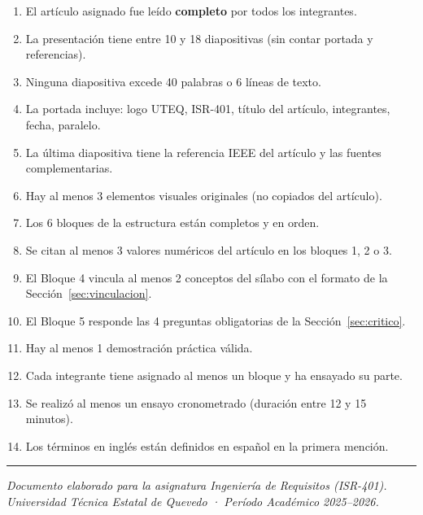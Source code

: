 \documentclass[11pt,a4paper]{article}
\newcommand{\goldrule}{\noindent\textcolor{gold}{\rule{\linewidth}{2pt}}}
\begin{document}
	\begin{okbox}
		\begin{enumerate}[leftmargin=18pt, itemsep=3pt, label=$\square$]
			\item El artículo asignado fue leído \textbf{completo} por todos los integrantes.
			\item La presentación tiene entre 10 y 18 diapositivas (sin contar portada y referencias).
			\item Ninguna diapositiva excede 40 palabras o 6 líneas de texto.
			\item La portada incluye: logo UTEQ, ISR-401, título del artículo, integrantes, fecha, paralelo.
			\item La última diapositiva tiene la referencia IEEE del artículo y las fuentes complementarias.
			\item Hay al menos 3 elementos visuales originales (no copiados del artículo).
			\item Los 6 bloques de la estructura están completos y en orden.
			\item Se citan al menos 3 valores numéricos del artículo en los bloques 1, 2 o 3.
			\item El Bloque 4 vincula al menos 2 conceptos del sílabo con el formato de la Sección~\ref{sec:vinculacion}.
			\item El Bloque 5 responde las 4 preguntas obligatorias de la Sección~\ref{sec:critico}.
			\item Hay al menos 1 demostración práctica válida.
			\item Cada integrante tiene asignado al menos un bloque y ha ensayado su parte.
			\item Se realizó al menos un ensayo cronometrado (duración entre 12 y 15 minutos).
			\item Los términos en inglés están definidos en español en la primera mención.
		\end{enumerate}
	\end{okbox}
	
	\vspace{12pt}
	\goldrule
	\begin{center}
		\small\color{darkblue}\textit{Documento elaborado para la asignatura Ingeniería de Requisitos (ISR-401).}\\
		\small\color{darkblue}\textit{Universidad Técnica Estatal de Quevedo · Período Académico 2025--2026.}
	\end{center}
	
\end{document}

